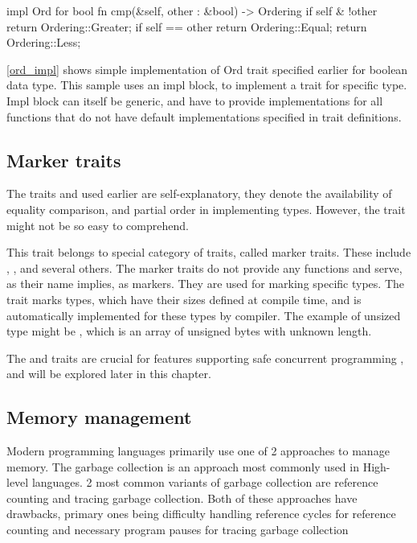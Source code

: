\begin{code}[language=rust,label={ord_impl},caption={Trait implementation}]
    impl Ord for bool {
        fn cmp(&self, other : &bool) -> Ordering {
            if self & !other {
                return Ordering::Greater;
            }
            if self == other {
                return Ordering::Equal;
            }
            return Ordering::Less;
        }
    }
\end{code}

\autoref{ord_impl} shows simple implementation of Ord trait specified earlier for boolean data type. This sample
uses an impl block, to implement a trait for specific type. Impl block can itself be generic, and have to provide
implementations for all functions that do not have default implementations specified in trait definitions.

\subsection{Marker traits}
The traits  and  used earlier are self-explanatory, they denote the availability of equality comparison, and partial order
in implementing types. However, the  trait might not be so easy to comprehend.

This trait belongs to special category of traits, called marker traits. These include  , ,  and several others.
The marker traits do not provide any functions and serve, as their name implies, as markers. They are used for marking specific
types. The  trait marks types, which have their sizes defined at compile time, and is automatically implemented
for these types by compiler. The example of unsized type might be \type{[u8]} , which is an array of unsigned bytes with unknown length.

The  and  traits are crucial for features supporting safe concurrent programming , and will be explored later in
this chapter.

\subsection{Memory management}
Modern programming languages primarily use one of 2 approaches to manage memory.
The garbage collection is an approach most commonly used in High-level languages. 2 most common variants of
garbage collection are reference counting and tracing garbage collection. Both of these approaches have drawbacks, primary ones being
difficulty handling reference cycles for reference counting and necessary program pauses for tracing garbage collection

